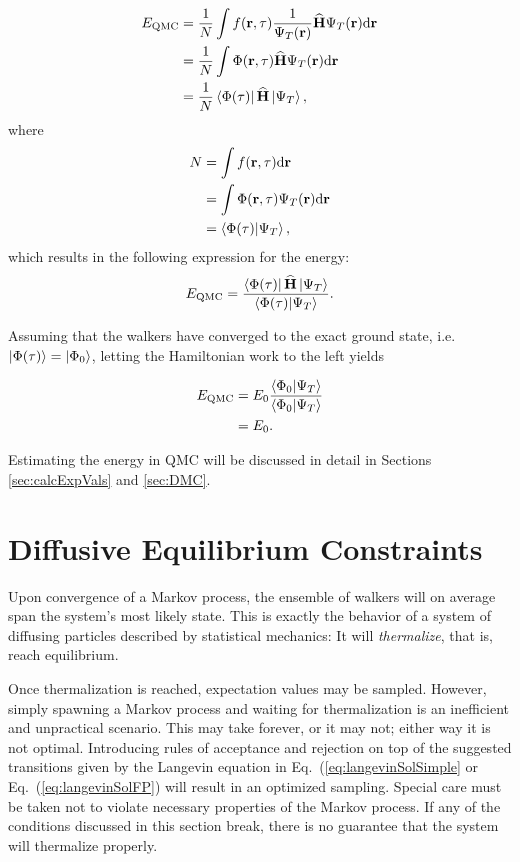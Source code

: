 \begin{align*}
 E_\mathrm{QMC} &= \frac{1}{N}\int f(\mathbf{r}, \tau) \frac{1}{\Psi_T(\mathbf{r})} {\bf\widehat{H}} \Psi_T(\mathbf{r}) \mathrm{d}\mathbf{r} \\
                &= \frac{1}{N}\int \Phi(\mathbf{r}, \tau) {\bf\widehat{H}} \Psi_T(\mathbf{r}) \mathrm{d}\mathbf{r} \\
                &= \frac{1}{N}\left< \Phi(\tau) \right|{\bf\widehat{H}}\left| \Psi_T \right>, \\
\end{align*}
where 
\begin{align*}
               N&= \int f(\mathbf{r}, \tau) \mathrm{d}\mathbf{r} \\
                &= \int \Phi(\mathbf{r}, \tau)\Psi_T(\mathbf{r})\mathrm{d}\mathbf{r} \\
                &= \left\langle \Phi(\tau) | \Psi_T\right\rangle,\\
 \end{align*}
which results in the following expression for the energy:
\begin{align*}               
 E_\mathrm{QMC} &= \frac{\left< \Phi(\tau) \right|{\bf\widehat{H}}\left| \Psi_T \right>}{\left\langle \Phi(\tau) | \Psi_T\right\rangle}.\\
\end{align*}

Assuming that the walkers have converged to the exact ground state, i.e.~$\left| \Phi(\tau) \right>=\left| \Phi_0 \right>$, letting the Hamiltonian work to the left yields

\begin{align*}
 E_\mathrm{QMC} &= E_0\frac{\left\langle \Phi_0 | \Psi_T\right\rangle}{\left\langle \Phi_0 | \Psi_T\right\rangle} \\
                &= E_0.
\end{align*}

Estimating the energy in QMC will be discussed in detail in Sections \ref{sec:calcExpVals} and \ref{sec:DMC}. 

\section{Diffusive Equilibrium Constraints}

Upon convergence of a Markov process, the ensemble of walkers will on average span the system's most likely state. This is exactly the behavior of a system of diffusing particles described by statistical mechanics: It will \textit{thermalize}, that is, reach equilibrium. 

Once thermalization is reached, expectation values may be sampled. However, simply spawning a Markov process and waiting for thermalization is an inefficient and unpractical scenario. This may take forever, or it may not; either way it is not optimal. Introducing rules of acceptance and rejection on top of the suggested transitions given by the Langevin equation in Eq.~(\ref{eq:langevinSolSimple} or Eq.~(\ref{eq:langevinSolFP}) will result in an optimized sampling. Special care must be taken not to violate necessary properties of the Markov process. If any of the conditions discussed in this section break, there is no guarantee that the system will thermalize properly.

